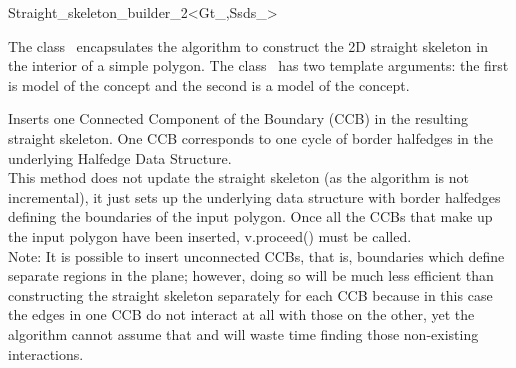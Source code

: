 

\begin{ccRefClass}{Straight_skeleton_builder_2<Gt_,Ssds_>}

\ccDefinition
The class \ccRefName\  encapsulates the algorithm to construct the 2D straight skeleton in the interior of a simple polygon. The class \ccRefName\  has two template arguments: the first is model of the  concept and the second is a model of the  concept.

\ccTypes
\ccGlue

\ccCreation
{}  %


 {Inserts one Connected Component of the Boundary (CCB) in the resulting straight skeleton. One CCB corresponds to one cycle of border halfedges in the underlying Halfedge Data Structure.\\ This method does not update the straight skeleton (as the algorithm is not incremental), it just sets up the underlying data structure with border halfedges defining the boundaries of the input polygon. Once all the CCBs that make up the input polygon have been inserted, v.proceed() must be called.\\
  Note: It is possible to insert unconnected CCBs, that is, boundaries which define separate regions in the plane; however, doing so will be much less efficient than constructing the straight skeleton separately for each CCB because in this case the edges in one CCB do not interact at all with those on the other, yet the algorithm cannot assume that and will waste time finding those non-existing interactions.}
\ccGlue
{}


\end{ccRefClass}
